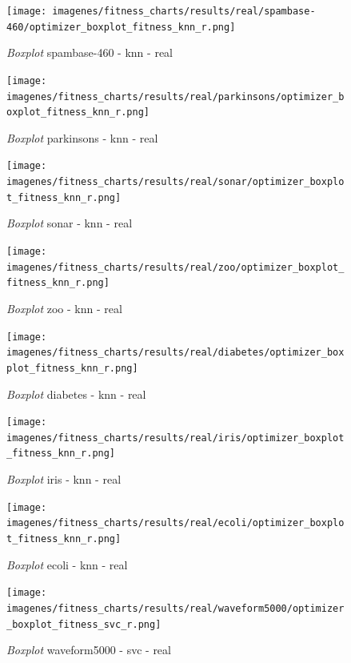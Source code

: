 \begin{figure}[htp]
    \centering
    \texttt{[image: imagenes/fitness\_charts/results/real/spambase-460/optimizer\_boxplot\_fitness\_knn\_r.png]}
    \caption{\textit{Boxplot} spambase-460 - knn - real}

\end{figure}

\begin{figure}[htp]
    \centering
    \texttt{[image: imagenes/fitness\_charts/results/real/parkinsons/optimizer\_boxplot\_fitness\_knn\_r.png]}
    \caption{\textit{Boxplot} parkinsons - knn - real}

\end{figure}

\begin{figure}[htp]
    \centering
    \texttt{[image: imagenes/fitness\_charts/results/real/sonar/optimizer\_boxplot\_fitness\_knn\_r.png]}
    \caption{\textit{Boxplot} sonar - knn - real}

\end{figure}

\begin{figure}[htp]
    \centering
    \texttt{[image: imagenes/fitness\_charts/results/real/zoo/optimizer\_boxplot\_fitness\_knn\_r.png]}
    \caption{\textit{Boxplot} zoo - knn - real}

\end{figure}

\begin{figure}[htp]
    \centering
    \texttt{[image: imagenes/fitness\_charts/results/real/diabetes/optimizer\_boxplot\_fitness\_knn\_r.png]}
    \caption{\textit{Boxplot} diabetes - knn - real}

\end{figure}

\begin{figure}[htp]
    \centering
    \texttt{[image: imagenes/fitness\_charts/results/real/iris/optimizer\_boxplot\_fitness\_knn\_r.png]}
    \caption{\textit{Boxplot} iris - knn - real}

\end{figure}

\begin{figure}[htp]
    \centering
    \texttt{[image: imagenes/fitness\_charts/results/real/ecoli/optimizer\_boxplot\_fitness\_knn\_r.png]}
    \caption{\textit{Boxplot} ecoli - knn - real}

\end{figure}

\begin{figure}[htp]
    \centering
    \texttt{[image: imagenes/fitness\_charts/results/real/waveform5000/optimizer\_boxplot\_fitness\_svc\_r.png]}
    \caption{\textit{Boxplot} waveform5000 - svc - real}

\end{figure}


